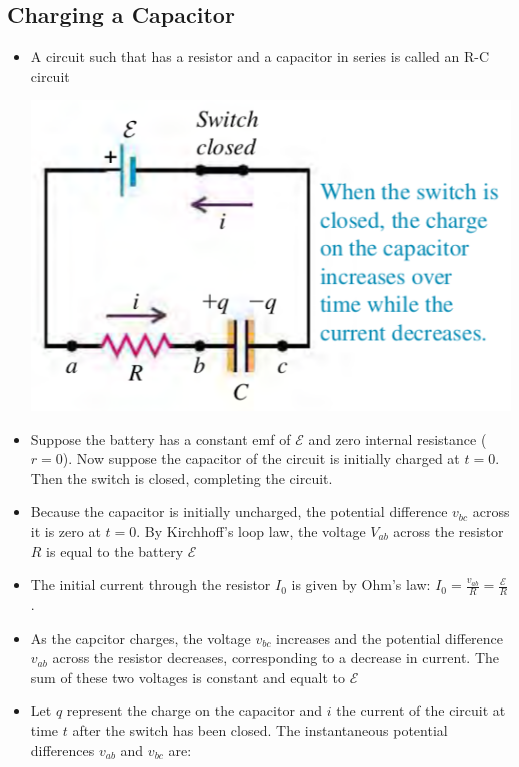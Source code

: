 \documentclass[11pt, a4paper]{article}
\begin{document}
\subsection{Charging a Capacitor}
\begin{itemize}
    \item A circuit such that has a resistor and a capacitor in series is called
        an R-C circuit

    \centerline{\includegraphics[scale=0.65]{images/RC_circuit.png}}
    \item Suppose the battery has a constant emf of $\mathcal{E}$ and zero internal
        resistance ($r = 0$). Now suppose the capacitor of the circuit is initially
        charged at $t=0$. Then the switch is closed, completing the circuit.
    \item Because the capacitor is initially uncharged, the potential difference $v_{bc}$
        across it is zero at $t = 0$. By Kirchhoff's loop law, the voltage $V_{ab}$
        across the resistor $R$ is equal to the battery $\mathcal{E}$
    \item The initial current through the resistor $I_0$ is given by Ohm's law:
        $I_{0}=\frac{v_{ab}}{R} = \frac{\mathcal{E}}{R}$.
    \item As the capcitor charges, the voltage $v_{bc}$ increases and the potential
        difference $v_{ab}$ across the resistor decreases, corresponding to a decrease in
        current. The sum of these two voltages is constant and equalt to $\mathcal{E}$
    \item Let $q$ represent the charge on the capacitor and $i$ the current of the
        circuit at time $t$ after the switch has been closed. The instantaneous potential
        differences $v_{ab}$ and $v_{bc}$ are:

\end{itemize}
\end{document}
